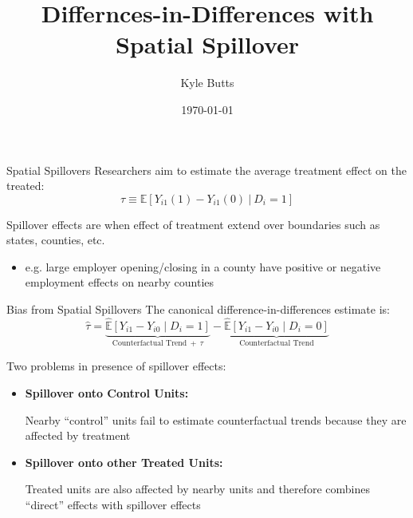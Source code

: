\documentclass[aspectratio=43]{beamer}
\title{Differnces-in-Differences with Spatial Spillover}
\date{\today}
\author{Kyle Butts}
\begin{document}
\maketitle

\begin{frame}{Spatial Spillovers}
    Researchers aim to estimate the average treatment effect on the treated: 
    \[
        \tau \equiv \mathbb{E} \left[ Y_{i1}(1) - Y_{i1}(0) \ \vert \ D_{i} = 1 \right]
    \]
    
    \vspace{5mm}
    Spillover effects are when effect of treatment extend over boundaries such as states, counties, etc.
    
    \begin{itemize}
        \item e.g. large employer opening/closing in a county have positive or negative employment effects on nearby counties
    \end{itemize}
\end{frame}


\begin{frame}{Bias from Spatial Spillovers}
    The canonical difference-in-differences estimate is: 
    \[ 
        \hat{\tau} = \underbrace{\hat{\mathbb{E}} \left[ Y_{i1} - Y_{i0} \mid D_i = 1 \right]}_{\text{Counterfactual Trend} \ + \ \tau} - 
        \underbrace{\hat{\mathbb{E}} \left[ Y_{i1} - Y_{i0} \mid D_i = 0 \right]}_{\text{Counterfactual Trend}}
    \]

    Two problems in presence of spillover effects: 
    \begin{itemize}
        \item \textbf{Spillover onto Control Units:} 
        
        Nearby ``control'' units fail to estimate counterfactual trends because they are affected by treatment
        
        \item \textbf{Spillover onto other Treated Units:} 
        
        Treated units are also affected by nearby units and therefore combines ``direct'' effects with spillover effects
    \end{itemize}

\end{frame}

\end{document}
